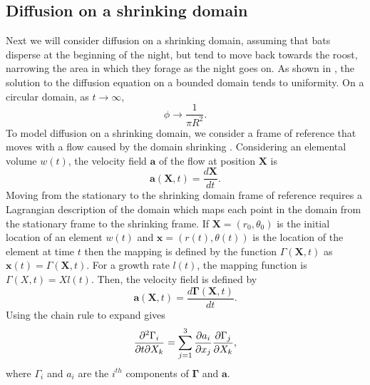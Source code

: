 
 \subsection{Diffusion on a shrinking domain} \label{shrink}
 Next we will consider diffusion on a shrinking domain, assuming that bats disperse at the beginning of the night, but tend to move back towards the roost, narrowing the area in which they forage as the night goes on. As shown in , the solution to the diffusion equation on a bounded domain tends to uniformity. On a circular domain, as $t\rightarrow  \infty$,
  \begin{equation}
  \phi \rightarrow \frac{1}{\pi R^2}.
  \label{eqn:uniform_circle}
  \end{equation}
 To model diffusion on a shrinking domain, we consider a frame of reference that moves with a flow caused by the domain shrinking \cite{crampinnonuniform}. Considering an elemental volume $w(t)$, the velocity field $\bm{a}$ of the flow at position $\bm{X}$ is
%
\begin{equation}
\bm{a}(\bm{X},t) = \frac{d\bm{X}}{dt}.
\end{equation}
%
Moving from the stationary to the shrinking domain frame of reference requires a Lagrangian description of the domain which maps each point in the domain from the stationary frame to the shrinking frame. If $\bm{X} = (r_0,\theta_0)$ is the initial location of an element $w(t)$ and $\bm{x} = (r(t),\theta(t))$ is the location of the element at time $t$ then the mapping is defined by the function $\Gamma(\bm{X},t) $ as $\bm{x}(t) =\Gamma(\bm{X},t) $. For a growth rate $l(t)$, the mapping function is $\Gamma(X,t) = Xl(t)$. Then, the velocity field is defined by
%
\begin{equation}
\bm{a}(\bm{X},t) = \frac{d\bm{\Gamma}(\bm{X},t)}{dt} .
\label{dgammadt}
\end{equation}
%
Using the chain rule to expand  gives
%
\begin{equation}
    \frac{\partial^2 \Gamma_i}{\partial t\partial X_k} = \sum_{j=1}^{3}\frac{\partial a_i}{\partial x_j}\frac{\partial \Gamma_j}{\partial X_k},
\end{equation}
%
where $\Gamma_i$ and $a_i$ are the $i^{th}$ components of $\bm{\Gamma}$ and $\bm{a}$.

